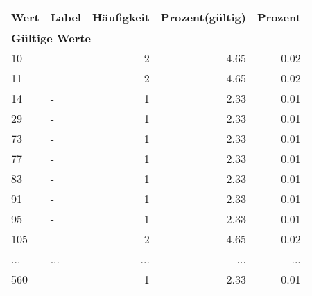      \begin{longtable}{lXrrr}
     \toprule
     \textbf{Wert} & \textbf{Label} & \textbf{Häufigkeit} & \textbf{Prozent(gültig)} & \textbf{Prozent} \\
     \endhead
     \midrule
     \multicolumn{5}{l}{\textbf{Gültige Werte}}\\
        10 & \multicolumn{1}{X}{-} & %
          \num{2} &
          \num[round-mode=places,round-precision=2]{4,65} &
          \num[round-mode=places,round-precision=2]{0,02} \\
        11 & \multicolumn{1}{X}{-} & %
          \num{2} &
          \num[round-mode=places,round-precision=2]{4,65} &
          \num[round-mode=places,round-precision=2]{0,02} \\
        14 & \multicolumn{1}{X}{-} & %
          \num{1} &
          \num[round-mode=places,round-precision=2]{2,33} &
          \num[round-mode=places,round-precision=2]{0,01} \\
        29 & \multicolumn{1}{X}{-} & %
          \num{1} &
          \num[round-mode=places,round-precision=2]{2,33} &
          \num[round-mode=places,round-precision=2]{0,01} \\
        73 & \multicolumn{1}{X}{-} & %
          \num{1} &
          \num[round-mode=places,round-precision=2]{2,33} &
          \num[round-mode=places,round-precision=2]{0,01} \\
        77 & \multicolumn{1}{X}{-} & %
          \num{1} &
          \num[round-mode=places,round-precision=2]{2,33} &
          \num[round-mode=places,round-precision=2]{0,01} \\
        83 & \multicolumn{1}{X}{-} & %
          \num{1} &
          \num[round-mode=places,round-precision=2]{2,33} &
          \num[round-mode=places,round-precision=2]{0,01} \\
        91 & \multicolumn{1}{X}{-} & %
          \num{1} &
          \num[round-mode=places,round-precision=2]{2,33} &
          \num[round-mode=places,round-precision=2]{0,01} \\
        95 & \multicolumn{1}{X}{-} & %
          \num{1} &
          \num[round-mode=places,round-precision=2]{2,33} &
          \num[round-mode=places,round-precision=2]{0,01} \\
        105 & \multicolumn{1}{X}{-} & %
          \num{2} &
          \num[round-mode=places,round-precision=2]{4,65} &
          \num[round-mode=places,round-precision=2]{0,02} \\
       ... & ... & ... & ... & ... \\
        560 & \multicolumn{1}{X}{-} & %
          \num{1} &
          \num[round-mode=places,round-precision=2]{2,33} &
          \num[round-mode=places,round-precision=2]{0,01} \\


\end{longtable}
